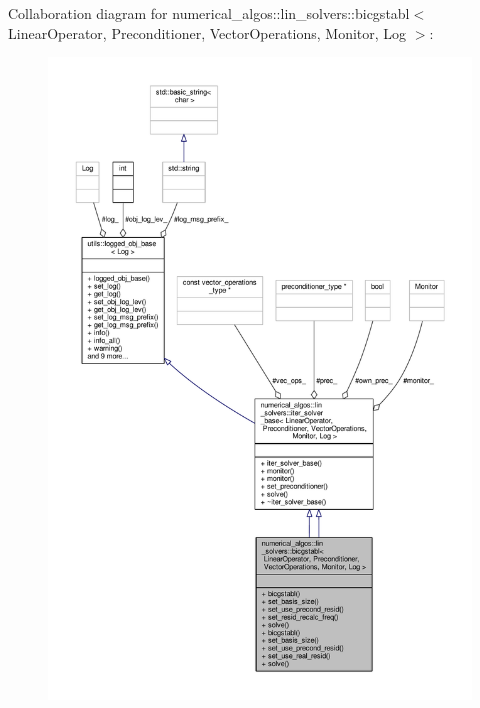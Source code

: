 Collaboration diagram for numerical\-\_\-algos\-:\-:lin\-\_\-solvers\-:\-:bicgstabl$<$ Linear\-Operator, Preconditioner, Vector\-Operations, Monitor, Log $>$\-:
\nopagebreak
\begin{figure}[H]
\begin{center}
\leavevmode
\includegraphics[width=350pt]{classnumerical__algos_1_1lin__solvers_1_1bicgstabl__coll__graph}
\end{center}
\end{figure}
